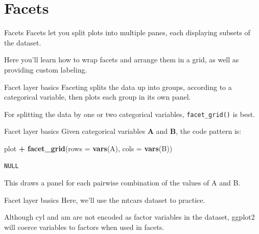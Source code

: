 \documentclass[
  ignorenonframetext,
]{beamer}
\newenvironment{Shaded}{\begin{snugshade}}{\end{snugshade}}
\newcommand{\AttributeTok}[1]{\textcolor[rgb]{0.13,0.29,0.53}{#1}}
\newcommand{\FunctionTok}[1]{\textcolor[rgb]{0.13,0.29,0.53}{\textbf{#1}}}
\newcommand{\NormalTok}[1]{#1}
\newcommand{\SpecialCharTok}[1]{\textcolor[rgb]{0.81,0.36,0.00}{\textbf{#1}}}
\begin{document}
\section{Facets}\label{facets}

\begin{frame}{Facets}
\label{facets-1}
Facets let you split plots into multiple panes, each displaying subsets
of the dataset.

Here you'll learn how to wrap facets and arrange them in a grid, as well
as providing custom labeling.
\end{frame}

\begin{frame}[fragile]{Facet layer basics}
\label{facet-layer-basics}
Faceting splits the data up into groups, according to a categorical
variable, then plots each group in its own panel.

For splitting the data by one or two categorical variables,
\texttt{facet\_grid()} is best.
\end{frame}

\begin{frame}[fragile]{Facet layer basics}
\label{facet-layer-basics-1}
Given categorical variables \textbf{A} and \textbf{B}, the code pattern
is:


\begin{Shaded}
\begin{Highlighting}[]
\NormalTok{plot }\SpecialCharTok{+} \FunctionTok{facet\_grid}\NormalTok{(}\AttributeTok{rows =} \FunctionTok{vars}\NormalTok{(A), }\AttributeTok{cols =} \FunctionTok{vars}\NormalTok{(B))}
\end{Highlighting}
\end{Shaded}

\begin{verbatim}
NULL
\end{verbatim}

This draws a panel for each pairwise combination of the values of A and
B.
\end{frame}

\begin{frame}{Facet layer basics}
\label{facet-layer-basics-2}
Here, we'll use the mtcars dataset to practice.

Although cyl and am are not encoded as factor variables in the dataset,
ggplot2 will coerce variables to factors when used in facets.
\end{frame}
\end{document}
